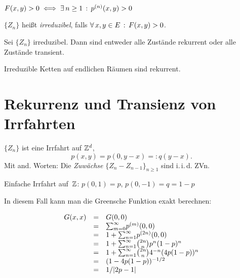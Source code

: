 \documentclass{cheat-sheet}
\newcommand{\iid}{i.\,i.\,d.} %
\begin{document}
\begin{bem}
  $F(x, y) > 0 \iff \exists \, {n \geq 1} \,:\, p^{(n)}(x, y) > 0$
\end{bem}

\begin{defn}
  $\{ Z_n \}$ heißt \emph{irreduzibel}, falls $\forall \, {x, y \in E} \,:\, F(x, y) > 0$.
\end{defn}

\begin{satz}
  Sei $\{ Z_n \}$ irreduzibel.
  Dann sind entweder alle Zustände rekurrent oder alle Zustände transient.
\end{satz}


\begin{satz}
  Irreduzible Ketten auf endlichen Räumen sind rekurrent.
\end{satz}

\section{Rekurrenz und Transienz von Irrfahrten}

\begin{situation}
  $\{ Z_n \}$ ist eine Irrfahrt auf $\mathbb{Z}^d$, \dh{}
  \[ p(x, y) = p(0, y - x) =: q(y - x). \]
  Mit and. Worten: Die \textit{Zuwächse} $\{ Z_n - Z_{n-1} \}_{n \geq 1}$ sind \iid{} ZVn.
\end{situation}

\begin{bsp}
  Einfache Irrfahrt auf~$\mathbb{Z}$: \quad
  $p(0, 1) = p$, $p(0, -1) = q = 1 - p$
\end{bsp}


In diesem Fall kann man die Greensche Funktion exakt berechnen:

\[
  \begin{array}{r c l}
    G(x, x) &=& G(0,0) \\
    &=& {\sum}_{m=0}^\infty p^{(m)}(0, 0) \\
    &=& 1 + {\sum}_{n=1}^\infty p^{(2n)}(0, 0) \\
    &=& 1 + {\sum}_{n=1}^\infty \tbinom{2n}{n} p^n (1-p)^n \\
    &=& 1 + {\sum}_{n=1}^\infty \tbinom{2n}{n} 4^{-n} (4 p (1-p))^n \\
    &=& (1 - 4 p (1-p))^{-1/2} \\
    &=& 1/\abs{2p - 1}
  \end{array}
\]
\end{document}

